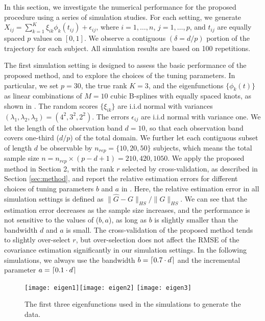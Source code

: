 \documentclass[11pt]{article}
\DeclarePairedDelimiter\ceil{\lceil}{\rceil}
\newcommand{\0}{{\mathbf{0}}}
\newcommand{\1}{{\mathbf{1}}}
\begin{document}
 In this section, we investigate the numerical performance for the proposed procedure using a series of simulation studies. For each setting, we generate $X_{ij} = \sum_{k=1}^{K}\xi_{ik}\phi_{k}(t_{ij}) + \epsilon_{ij}$, where $i=1,\ldots, n$, $j=1,\ldots, p$, and $t_{ij}$ are equally spaced $p$ values on $[0,1]$. We observe a contiguous $(\delta = d/p)$ portion of the trajectory for each subject. All simulation results are based on 100 repetitions.

The first simulation setting is designed to assess the basic performance of the proposed method, and to explore the choices of the tuning parameters. In particular, we set $p = 30$, the true rank $K= 3$, and the eigenfunctions $\{\phi_k(t)\}$ as linear combinations of $M=10$ cubic B-splines with equally spaced knots, as shown in . The random scores $\{\xi_{ik}\}$ are i.i.d normal with variances $(\lambda_1, \lambda_2,\lambda_3) = (4^2, 3^2, 2^2)$. The errors $\epsilon_{ij}$ are i.i.d normal with variance one.  We let the length of the observation band $d=10$, so that each observation band covers one-third ($d/p$) of the total domain. We further let each contiguous subset of length $d$ be observable by $n_{rep} = \{10, 20, 50\}$ subjects, which means the total sample size $n = n_{rep}\times(p-d+1) = 210, 420, 1050$. We apply the proposed method in Section 2, with the rank $r$ selected by cross-validation, as described in Section \ref{sec:method}, and report the relative estimation errors for different choices of tuning parameters $b$ and $a$ in . Here, the relative estimation error in all simulation settings is defined as $\|\hat{G} - G\|_{HS}/\|G\|_{HS}$. We can see that the estimation error decreases as the sample size increases, and the performance is not sensitive to the values of ($b,a$), as long as $b$ is slightly smaller than the bandwidth $d$ and $a$ is small. The cross-validation of the proposed method tends to slightly over-select $r$, but over-selection does not affect the RMSE of the covariance estimation significantly in our simulation settings. In the following simulations, we always use the bandwidth $b= \ceil{0.7\cdot d}$ and the incremental parameter $a = \ceil{0.1\cdot d}$ 



\begin{figure}
	\centerline{
		\texttt{[image: eigen1]}\texttt{[image: eigen2]}	\texttt{[image: eigen3]}}
	\caption{The first three eigenfunctions used in the simulations to generate the data.}
	\label{fig:eigenfunctions} 
\end{figure}
\end{document}
